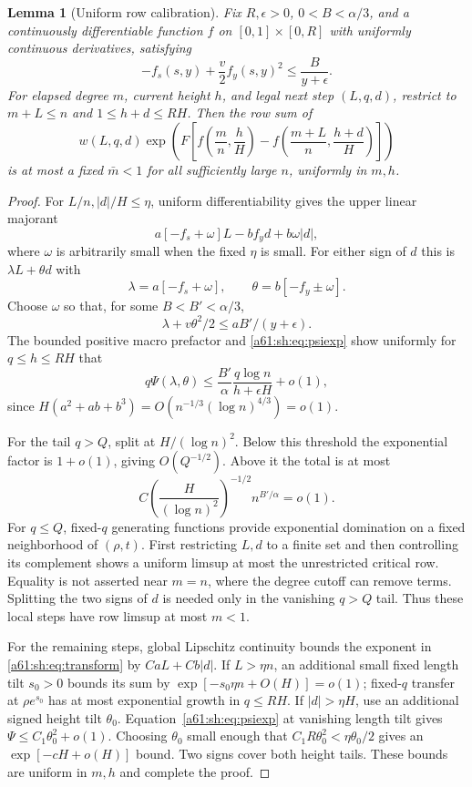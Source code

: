 \documentclass[11pt,letterpaper]{article}
\numberwithin{equation}{section}
\newtheorem{lemma}[theorem]{Lemma}
\theoremstyle{remark}\newtheorem{remark}[theorem]{Remark}
\begin{document}
\begin{lemma}[Uniform row calibration]\label{a61:sh:lem:row}
Fix $R,\epsilon>0$, $0<B<\alpha/3$, and a continuously differentiable function $f$ on $[0,1]\times[0,R]$ with uniformly continuous derivatives, satisfying
\begin{equation}\label{a61:sh:eq:HJ}
 -f_s(s,y)+\frac v2 f_y(s,y)^2\le\frac{B}{y+\epsilon}.
\end{equation}
For elapsed degree $m$, current height $h$, and legal next step $(L,q,d)$, restrict to $m+L\le n$ and $1\le h+d\le RH$. Then the row sum of
\begin{equation}\label{a61:sh:eq:transform}
 w(L,q,d)\exp\!\left(F\left[f\!\left(\frac mn,\frac hH\right)
 -f\!\left(\frac{m+L}{n},\frac{h+d}{H}\right)\right]\right)
\end{equation}
is at most a fixed $\bar m<1$ for all sufficiently large $n$, uniformly in $m,h$.
\end{lemma}
\begin{proof}
For $L/n,|d|/H\le\eta$, uniform differentiability gives the upper linear majorant
\[
 a[-f_s+\omega]L-bf_y d+b\omega|d|,
\]
where $\omega$ is arbitrarily small when the fixed $\eta$ is small. For either sign of $d$ this is $\lambda L+\theta d$ with
\[
 \lambda=a[-f_s+\omega],\qquad \theta=b[-f_y\pm\omega].
\]
Choose $\omega$ so that, for some $B<B'<\alpha/3$,
\[
 \lambda+v\theta^2/2\le aB'/(y+\epsilon).
\]
The bounded positive macro prefactor and \eqref{a61:sh:eq:psiexp} show uniformly for $q\le h\le RH$ that
\[
 q\Psi(\lambda,\theta)
 \le\frac{B'}\alpha\frac{q\log n}{h+\epsilon H}+o(1),
\]
since $H(a^2+ab+b^3)=O(n^{-1/3}(\log n)^{4/3})=o(1)$.

For the tail $q>Q$, split at $H/(\log n)^2$. Below this threshold the exponential factor is $1+o(1)$, giving $O(Q^{-1/2})$. Above it the total is at most
\[
 C\left(\frac{H}{(\log n)^2}\right)^{-1/2}n^{B'/\alpha}=o(1).
\]
For $q\le Q$, fixed-$q$ generating functions provide exponential domination on a fixed neighborhood of $(\rho,t)$. First restricting $L,d$ to a finite set and then controlling its complement shows a uniform limsup at most the unrestricted critical row. Equality is not asserted near $m=n$, where the degree cutoff can remove terms. Splitting the two signs of $d$ is needed only in the vanishing $q>Q$ tail. Thus these local steps have row limsup at most $m<1$.

For the remaining steps, global Lipschitz continuity bounds the exponent in \eqref{a61:sh:eq:transform} by $CaL+Cb|d|$. If $L>\eta n$, an additional small fixed length tilt $s_0>0$ bounds its sum by $\exp[-s_0\eta n+O(H)]=o(1)$; fixed-$q$ transfer at $\rho e^{s_0}$ has at most exponential growth in $q\le RH$. If $|d|>\eta H$, use an additional signed height tilt $\theta_0$. Equation~\eqref{a61:sh:eq:psiexp} at vanishing length tilt gives $\Psi\le C_1\theta_0^2+o(1)$. Choosing $\theta_0$ small enough that $C_1R\theta_0^2<\eta\theta_0/2$ gives an $\exp[-cH+o(H)]$ bound. Two signs cover both height tails. These bounds are uniform in $m,h$ and complete the proof.
\end{proof}
\end{document}

